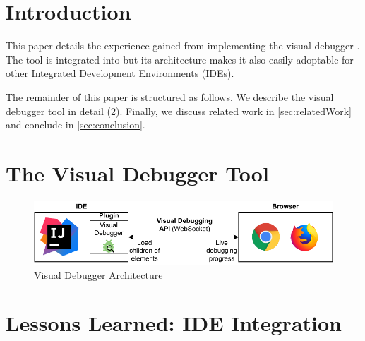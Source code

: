 \documentclass[sigconf]{acmart}
\begin{document}

\maketitle

\section{Introduction}
This paper details the experience gained from implementing the visual debugger \cite{krauterVisualDebuggerTool2022}.
The tool is integrated into \intellij \cite{timkrauterVisualDebuggerIntelliJ2023} but its architecture makes it also easily adoptable for other Integrated Development Environments (IDEs).


The remainder of this paper is structured as follows.
We describe the visual debugger tool in detail (\cref{sec:visualDebugger}).
Finally, we discuss related work in \cref{sec:relatedWork} and conclude in \cref{sec:conclusion}.


\section{The Visual Debugger Tool} \label{sec:visualDebugger}

\cite{krauterVisualDebuggerTool2022}

\begin{figure}[ht]
  \centering
  \includegraphics[width=\linewidth]{images/VD-architecture.pdf}
  \caption{Visual Debugger Architecture}
\end{figure}

\section{Lessons Learned: IDE Integration} \label{sec:lessonsLearned}
\end{document}
